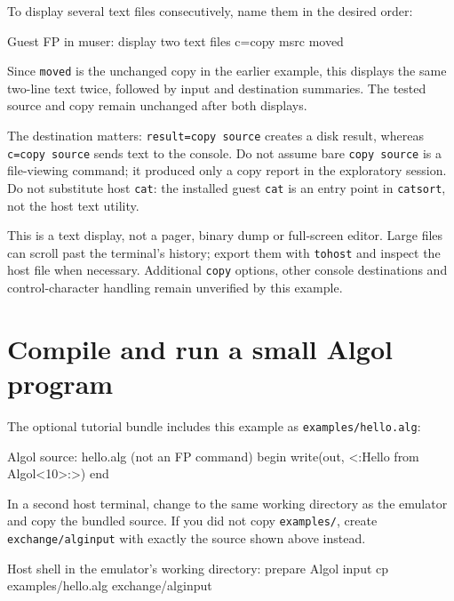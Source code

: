 To display several text files consecutively, name them in the desired order:

\begin{commandexample}{Guest FP in muser: display two text files}
c=copy msrc moved
\end{commandexample}

Since \passthrough{\lstinline!moved!} is the unchanged copy in the earlier example, this displays the same two-line text twice, followed by input and destination summaries. The tested source and copy remain unchanged after both displays.

The destination matters: \passthrough{\lstinline!result=copy source!} creates a disk result, whereas \passthrough{\lstinline!c=copy source!} sends text to the console. Do not assume bare \passthrough{\lstinline!copy source!} is a file-viewing command; it produced only a copy report in the exploratory session. Do not substitute host \passthrough{\lstinline!cat!}: the installed guest \passthrough{\lstinline!cat!} is an entry point in \passthrough{\lstinline!catsort!}, not the host text utility.

This is a text display, not a pager, binary dump or full-screen editor. Large files can scroll past the terminal's history; export them with \passthrough{\lstinline!tohost!} and inspect the host file when necessary. Additional \passthrough{\lstinline!copy!} options, other console destinations and control-character handling remain unverified by this example.

\section{Compile and run a small Algol program}\label{compile-and-run-a-small-algol-program}

The optional tutorial bundle includes this example as \passthrough{\lstinline!examples/hello.alg!}:

\begin{commandexample}{Algol source: hello.alg (not an FP command)}
begin
   write(out, <:Hello from Algol<10>:>)
end
\end{commandexample}

In a second host terminal, change to the same working directory as the
emulator and copy the bundled source. If you did not copy \texttt{examples/},
create \texttt{exchange/alginput} with exactly the source shown above instead.

\begin{commandexample}[language=sh]{Host shell in the emulator's working directory: prepare Algol input}
cp examples/hello.alg exchange/alginput
\end{commandexample}

